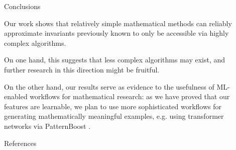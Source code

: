 \documentclass[final,20pt]{beamer}
\newcommand{\todo}[1]{{\color{blue}#1}}
\newlength{\sepwidth}
\newlength{\colwidth}
\newcommand{\separatorcolumn}{\begin{column}{\sepwidth}\end{column}}
\begin{document}
\begin{frame}[t, fragile]
\begin{columns}[t]
\begin{column}{\colwidth}
  \begin{exampleblock}{Conclusions}

    Our work shows that relatively simple mathematical methods
    can reliably approximate invariants previously known to only be accessible
    via highly complex algorithms.

    On one hand, this suggests that less complex algorithms
    may exist, and further research in this direction might be fruitful.

    On the other hand, our results serve as evidence
    to the usefulness of ML-enabled workflows for mathematical research:
    as we have proved that our features are learnable,
    we plan to use more sophisticated workflows for generating
    mathematically meaningful examples, e.g. using
    transformer networks via PatternBoost \cite{2411.00566}.
  \end{exampleblock}






  \begin{block}{References}

  {\footnotesize
  \printbibliography
}
  \end{block}

\end{column}

\separatorcolumn
\end{columns}
\end{frame}
\end{document}
